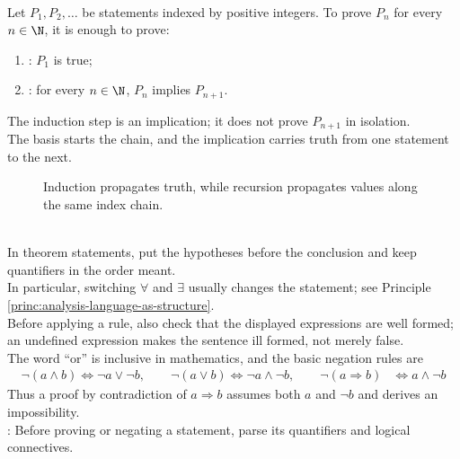 \begin{principle} \label{princ:mathematical-induction} \\
Let $P_1,P_2,\ldots$ be statements indexed by positive integers. To prove $P_n$ for every $n\in\N$, it is enough to prove:
\begin{enumerate}[label=(\roman*)]
\setlength{\itemsep}{0pt}
\item {}: $P_1$ is true;
\item {}: for every $n\in\N$, $P_n$ implies $P_{n+1}$.
\end{enumerate}
The induction step is an implication; it does not prove $P_{n+1}$ in isolation.\\
The basis starts the chain, and the implication carries truth from one statement to the next.
\end{principle}

\begin{figure}[H]
  \centering
  
  \caption{Induction propagates truth, while recursion propagates values along the same index chain.}
  \label{fig:peano-recursion-induction-ladder}
\end{figure}

\begin{method} \label{meth:proof-grammar-and-negation} \\
In theorem statements, put the hypotheses before the conclusion and keep quantifiers in the order meant.\\
In particular, switching $\forall$ and $\exists$ usually changes the statement; see Principle \ref{princ:analysis-language-as-structure}.\\
Before applying a rule, also check that the displayed expressions are well formed; an undefined expression makes the sentence ill formed, not merely false.\\
The word ``or'' is inclusive in mathematics, and the basic negation rules are
\begin{align}
\neg(a\land b)\Longleftrightarrow \neg a\lor\neg b, \qquad \neg(a\lor b)\Longleftrightarrow \neg a\land\neg b, \qquad \neg(a\Rightarrow b)&\Longleftrightarrow a\land\neg b \nonumber
\end{align}
Thus a proof by contradiction of $a\Rightarrow b$ assumes both $a$ and $\neg b$ and derives an impossibility.\\
: Before proving or negating a statement, parse its quantifiers and logical connectives.
\end{method}
